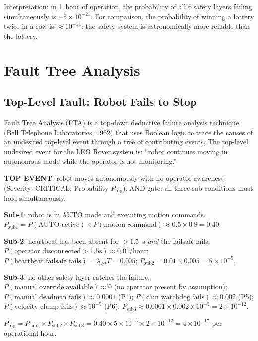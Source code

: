 Interpretation: in 1~hour of operation, the probability of all 6 safety layers failing simultaneously is $\sim5\times10^{-21}$. For comparison, the probability of winning a lottery twice in a row is $\approx10^{-14}$: the safety system is astronomically more reliable than the lottery.

\section{Fault Tree Analysis}

\subsection{Top-Level Fault: Robot Fails to Stop}

Fault Tree Analysis (FTA) is a top-down deductive failure analysis technique (Bell Telephone Laboratories, 1962) that uses Boolean logic to trace the causes of an undesired top-level event through a tree of contributing events. The top-level undesired event for the LEO Rover system is: ``robot continues moving in autonomous mode while the operator is not monitoring.''

\begin{eqblock}
\textbf{TOP EVENT}: robot moves autonomously with no operator awareness (Severity: CRITICAL; Probability $P_{\text{top}}$). AND-gate: all three sub-conditions must hold simultaneously.

\textbf{Sub-1}: robot is in AUTO mode and executing motion commands. $P_{\text{sub1}} = P(\text{AUTO active})\times P(\text{motion command}) \approx 0.5\times0.8 = 0.40$.

\textbf{Sub-2}: heartbeat has been absent for $>1.5$~s \emph{and} the failsafe fails. $P(\text{operator disconnected}>1.5\text{s})\approx0.01$/hour; $P(\text{heartbeat failsafe fails}) = \lambda_{P2}T = 0.005$; $P_{\text{sub2}} = 0.01\times0.005 = 5\times10^{-5}$.

\textbf{Sub-3}: no other safety layer catches the failure. $P(\text{manual override available})\approx0$ (no operator present by assumption); $P(\text{manual deadman fails})\approx0.0001$ (P4); $P(\text{cam watchdog fails})\approx0.002$ (P5); $P(\text{velocity clamp fails})\approx10^{-5}$ (P6); $P_{\text{sub3}} \approx 0.0001\times0.002\times10^{-5} = 2\times10^{-12}$.

$P_{\text{top}} = P_{\text{sub1}}\times P_{\text{sub2}}\times P_{\text{sub3}} = 0.40\times5\times10^{-5}\times2\times10^{-12} = 4\times10^{-17}$ per operational hour.
\end{eqblock}

